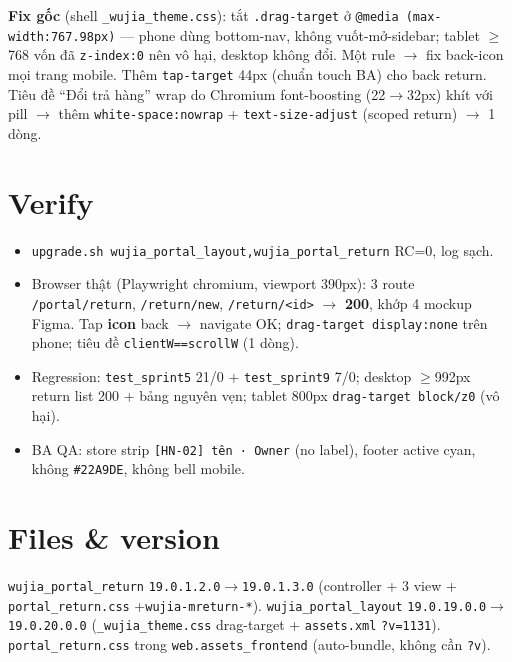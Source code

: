 \textbf{Fix gốc} (shell \texttt{\_wujia\_theme.css}): tắt \texttt{.drag-target} ở
\texttt{@media (max-width:767.98px)} --- phone dùng bottom-nav, không vuốt-mở-sidebar; tablet
\(\ge\)768 vốn đã \texttt{z-index:0} nên vô hại, desktop không đổi. Một rule \(\rightarrow\)
fix back-icon mọi trang mobile. Thêm \texttt{tap-target} 44px (chuẩn touch BA) cho back
return. Tiêu đề ``Đổi trả hàng'' wrap do Chromium font-boosting (22\(\rightarrow\)32px) khít
với pill \(\rightarrow\) thêm \texttt{white-space:nowrap} + \texttt{text-size-adjust} (scoped
return) \(\rightarrow\) 1 dòng.

\section{Verify}

\begin{itemize}
  \item \texttt{upgrade.sh wujia\_portal\_layout,wujia\_portal\_return} RC=0, log sạch.
  \item Browser thật (Playwright chromium, viewport 390px): 3 route \texttt{/portal/return},
        \texttt{/return/new}, \texttt{/return/<id>} \(\rightarrow\) \textbf{200}, khớp 4 mockup
        Figma. Tap \textbf{icon} back \(\rightarrow\) navigate OK; \texttt{drag-target
        display:none} trên phone; tiêu đề \texttt{clientW==scrollW} (1 dòng).
  \item Regression: \texttt{test\_sprint5} 21/0 + \texttt{test\_sprint9} 7/0; desktop
        \(\ge\)992px return list 200 + bảng nguyên vẹn; tablet 800px \texttt{drag-target
        block/z0} (vô hại).
  \item BA QA: store strip \texttt{[HN-02] tên · Owner} (no label), footer active cyan,
        không \texttt{\#22A9DE}, không bell mobile.
\end{itemize}

\section{Files \& version}

\texttt{wujia\_portal\_return} \texttt{19.0.1.2.0}\(\rightarrow\)\texttt{19.0.1.3.0} (controller +
3 view + \texttt{portal\_return.css} +\texttt{wujia-mreturn-*}). \texttt{wujia\_portal\_layout}
\texttt{19.0.19.0.0}\(\rightarrow\)\texttt{19.0.20.0.0} (\texttt{\_wujia\_theme.css} drag-target
+ \texttt{assets.xml} \texttt{?v=1131}). \texttt{portal\_return.css} trong
\texttt{web.assets\_frontend} (auto-bundle, không cần \texttt{?v}).

